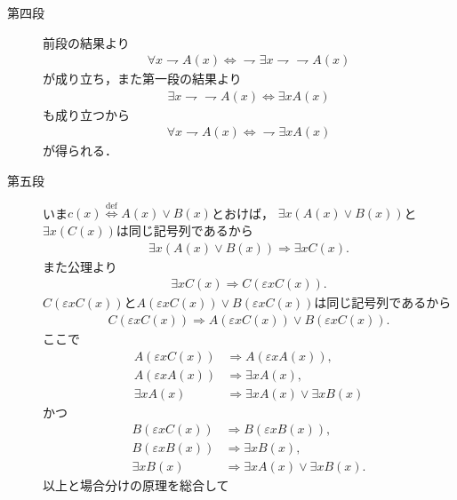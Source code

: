 \begin{prf}
\begin{description}
			\item[第四段]
				前段の結果より
				\begin{align}
					\forall x \rightharpoondown A(x) \Longleftrightarrow
					\rightharpoondown \exists x \rightharpoondown \rightharpoondown A(x)
				\end{align}
				が成り立ち，また第一段の結果より
				\begin{align}
					\exists x \rightharpoondown \rightharpoondown A(x)
					\Longleftrightarrow \exists x A(x)
				\end{align}
				も成り立つから
				\begin{align}
					\forall x \rightharpoondown A(x) \Longleftrightarrow
					\rightharpoondown \exists x A(x)
				\end{align}
				が得られる．
			
			\item[第五段]
				いま$c(x) \overset{\mathrm{def}}{\Longleftrightarrow} A(x) \vee B(x)$とおけば，
				$\exists x ( A(x) \vee B(x) )$と$\exists x ( C(x) )$は同じ記号列であるから
		\begin{align}
			\exists x ( A(x) \vee B(x) ) \Longrightarrow \exists x C(x).
		\end{align}
		また公理より
		\begin{align}
			\exists x C(x) \Longrightarrow C(\varepsilon x C(x)).
		\end{align}
		$C(\varepsilon x C(x))$と$A(\varepsilon x C(x)) \vee B(\varepsilon x C(x))$は同じ記号列であるから
		\begin{align}
			C(\varepsilon x C(x)) \Longrightarrow A(\varepsilon x C(x)) \vee B(\varepsilon x C(x)).
		\end{align}
		ここで
		\begin{align}
			A(\varepsilon x C(x)) &\Longrightarrow A(\varepsilon x A(x)), \\
			A(\varepsilon x A(x)) &\Longrightarrow \exists x A(x), \\
			\exists x A(x) &\Longrightarrow \exists x A(x) \vee \exists x B(x)
		\end{align}
		かつ
		\begin{align}
			B(\varepsilon x C(x)) &\Longrightarrow B(\varepsilon x B(x)), \\
			B(\varepsilon x B(x)) &\Longrightarrow \exists x B(x), \\
			\exists x B(x) &\Longrightarrow \exists x A(x) \vee \exists x B(x).
		\end{align}
		以上と場合分けの原理を総合して
		\begin{align}

\end{align}
\end{description}
\end{prf}
